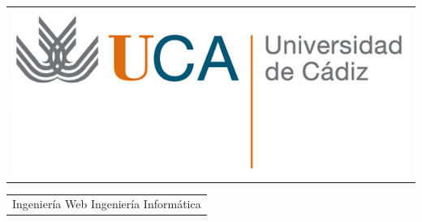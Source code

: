 \usepackage{charter,helvet}
\usepackage{a4wide,fancyhdr}
\usepackage{color,array,graphicx}


\newcommand{\lv}{\color{p152}\vline}
\setlength{\arrayrulewidth}{1pt}
\setlength{\extrarowheight}{-1ex}

\fancyhf{}
\setlength{\headheight}{50pt}

\lhead
{
  \footnotesize
  \begin{tabular}{@{}p{5cm}}
        \includegraphics[height=12ex]{uca/uca}
  \end{tabular}
}

\chead
{
%
}

\rhead
{
  \footnotesize
  \begin{tabular}{!{\lv}p{3.5cm}}
    \color{pcg9}
    Ingeniería Web               \newline
    \color{p308}
    Ingeniería Informática       \newline
    \mbox{}
  \end{tabular}
}

\renewcommand{\headrulewidth}{0pt}
\renewcommand{\footrulewidth}{0pt}

\pagestyle{fancy}
